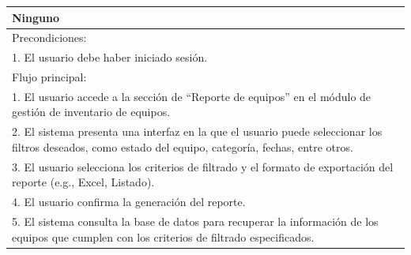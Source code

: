 \documentclass[stu, 12pt, letterpaper, donotrepeattitle, floatsintext, natbib]{apa7}
\begin{document}
\begin{longtable}{@{} p{16.5cm} @{}}
    Ninguno                                                                                                                                                                                                                                                                    \\ \midrule
    Precondiciones:                                                                                                                                                                                                                                                            \\
    1. El usuario debe haber iniciado sesión.                                                                                                                                                                                                                                  \\ \midrule
    Flujo principal:                                                                                                                                                                                                                                                           \\
    1. El usuario accede a la sección de ``Reporte de equipos'' en el módulo de gestión de inventario de equipos.                                                                                                                                                              \\
    2. El sistema presenta una interfaz en la que el usuario puede seleccionar los filtros deseados, como estado del equipo, categoría, fechas, entre otros.                                                                                                                   \\
    3. El usuario selecciona los criterios de filtrado y el formato de exportación del reporte (e.g., Excel, Listado).                                                                                                                                                         \\
    4. El usuario confirma la generación del reporte.                                                                                                                                                                                                                          \\
    5. El sistema consulta la base de datos para recuperar la información de los equipos que cumplen con los criterios de filtrado especificados.                                                                                                                              \\

\end{longtable}
\end{document}
